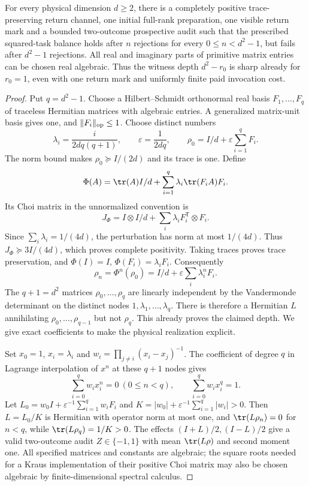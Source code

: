 \begin{theorem}\label{thm:sharp-return-depth}
For every physical dimension $d\ge2$, there is a completely positive trace-preserving return channel, one initial full-rank preparation, one visible return mark and a bounded two-outcome prospective audit such that the prescribed squared-task balance holds after $n$ rejections for every $0\le n<d^2-1$, but fails after $d^2-1$ rejections. All real and imaginary parts of primitive matrix entries can be chosen real algebraic. Thus the witness depth $d^2-r_0$ is sharp already for $r_0=1$, even with one return mark and uniformly finite paid invocation cost.
\end{theorem}
\begin{proof}
Put $q=d^2-1$. Choose a Hilbert--Schmidt orthonormal real basis $F_1,\ldots,F_q$ of traceless Hermitian matrices with algebraic entries. A generalized matrix-unit basis gives one, and $\|F_i\|_{\rm op}\le1$. Choose distinct numbers
\[
 \lambda_i=\frac{i}{2dq(q+1)},\qquad
 \varepsilon=\frac1{2dq},\qquad
 \rho_0=I/d+\varepsilon\sum_{i=1}^q F_i.
\]
The norm bound makes $\rho_0\succeq I/(2d)$ and its trace is one. Define
\[
 \Phi(A)=\tr(A)I/d+\sum_{i=1}^q\lambda_i\tr(F_iA)F_i.
\]
Its Choi matrix in the unnormalized convention is
\[
 J_\Phi=I\otimes I/d+\sum_i\lambda_i F_i^{\mathsf T}\otimes F_i.
\]
Since $\sum_i\lambda_i=1/(4d)$, the perturbation has norm at most $1/(4d)$. Thus $J_\Phi\succeq3I/(4d)$, which proves complete positivity. Taking traces proves trace preservation, and $\Phi(I)=I$, $\Phi(F_i)=\lambda_iF_i$. Consequently
\[
 \rho_n=\Phi^n(\rho_0)=I/d+\varepsilon\sum_i\lambda_i^nF_i.
\]
The $q+1=d^2$ matrices $\rho_0,\ldots,\rho_q$ are linearly independent by the Vandermonde determinant on the distinct nodes $1,\lambda_1,\ldots,\lambda_q$. There is therefore a Hermitian $L$ annihilating $\rho_0,\ldots,\rho_{q-1}$ but not $\rho_q$. This already proves the claimed depth. We give exact coefficients to make the physical realization explicit.

Set $x_0=1$, $x_i=\lambda_i$ and $w_i=\prod_{j\ne i}(x_i-x_j)^{-1}$. The coefficient of degree $q$ in Lagrange interpolation of $x^n$ at these $q+1$ nodes gives
\[
 \sum_{i=0}^q w_i x_i^n=0\ (0\le n<q),\qquad
 \sum_{i=0}^q w_i x_i^q=1.
\]
Let $L_0=w_0I+\varepsilon^{-1}\sum_{i=1}^q w_iF_i$ and
$K=|w_0|+\varepsilon^{-1}\sum_{i=1}^q|w_i|>0$.
Then $L=L_0/K$ is Hermitian with operator norm at most one, and
$\tr(L\rho_n)=0$ for $n<q$, while $\tr(L\rho_q)=1/K>0$.
The effects $(I+L)/2,(I-L)/2$ give a valid two-outcome audit $Z\in\{-1,1\}$ with mean $\tr(L\rho)$ and second moment one. All specified matrices and constants are algebraic; the square roots needed for a Kraus implementation of their positive Choi matrix may also be chosen algebraic by finite-dimensional spectral calculus.


\end{proof}
